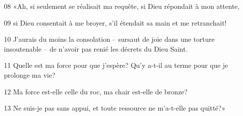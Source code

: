 
08 «Ah, si seulement se réalisait ma requête, si Dieu répondait à mon attente,

09 si Dieu consentait à me broyer, s’il étendait sa main et me retranchait!

10 J’aurais du moins la consolation – sursaut de joie dans une torture insoutenable – de n’avoir pas renié les décrets du Dieu Saint.

11 Quelle est ma force pour que j’espère? Qu’y a-t-il au terme pour que je prolonge ma vie?

12 Ma force est-elle celle du roc, ma chair est-elle de bronze?

13 Ne suis-je pas sans appui, et toute ressource ne m’a-t-elle pas quitté?»
